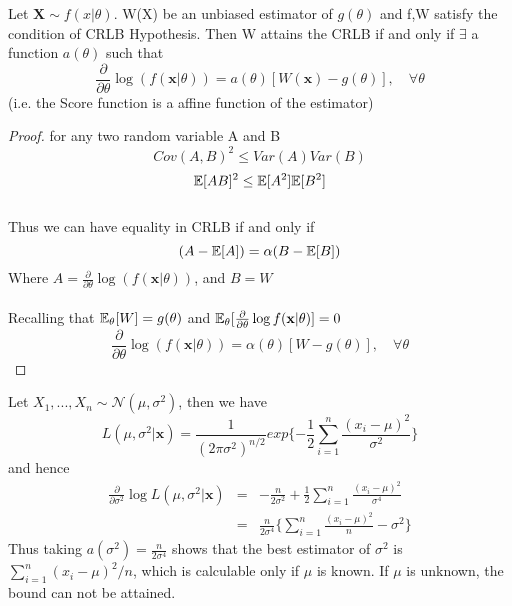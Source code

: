 \documentclass[a4paper,english,12pt]{article}
\newcommand{\bx}{\mathbf{x}}
\newcommand{\bX}{\mathbf{X}}
\begin{document}
\begin{cor}
Let $\bX \sim f(x|\theta)$. W(X) be an unbiased estimator of $g(\theta)$ and f,W satisfy the condition of CRLB Hypothesis. Then W attains the CRLB if and only if $\exists$ a function $a(\theta)$ such that
\begin{equation}
\frac{\partial}{\partial\theta} \log(f(\bx|\theta)) = a(\theta)[W(\bx)-g(\theta)], \quad \forall \theta
\end{equation}
(i.e. the Score function is a affine function of the estimator)
\begin{proof}
for any two random variable A and B
\begin{equation}
Cov(A,B)^2 \leq Var(A)Var(B)
\end{equation}
\begin{equation}
\mathbb{E}[AB]^2 \leq \mathbb{E}[A^2]\mathbb{E}[B^2]
\end{equation} \\
Thus we can have equality in CRLB if and only if
\begin{equation}
(A-\mathbb{E}[A]) = \alpha(B-\mathbb{E}[B])
\end{equation}
Where $A = \frac{\partial}{\partial\theta} \log(f(\bx|\theta))$, and $B=W$ \\ \\
Recalling that $\mathbb{E}_\theta[W] = g(\theta)$ and $\E_\theta[\frac{\partial}{\partial\theta} \log f(\bx|\theta)] = 0$
\begin{equation}
\frac{\partial}{\partial\theta} \log(f(\bx|\theta)) = \alpha(\theta)[W-g(\theta)], \quad \forall \theta
\end{equation}
\end{proof}
\end{cor}

\begin{exmp}[Application]
Let $X_1,...,X_n \sim \mathcal{N}(\mu,\sigma^{2})$, then we have
\begin{equation}
L(\mu,\sigma^2|\bx) = \frac{1}{(2\pi\sigma^2)^{n/2}}exp\{-\frac{1}{2}\sum_{i=1}^{n}\frac{(x_i-\mu)^2}{\sigma^2}\}
\end{equation}
and hence
\begin{eqnarray}
\frac{\partial}{\partial\sigma^2}\log L(\mu,\sigma^2|\bx) &=& -\frac{n}{2\sigma^2} + \frac{1}{2}\sum_{i=1}^{n}\frac{(x_i-\mu)^2}{\sigma^4}\\
&=& \frac{n}{2\sigma^4}\{\sum_{i=1}^{n}\frac{(x_i-\mu)^2}{n} - \sigma^2\}
\end{eqnarray}
Thus taking $a(\sigma^2) = \frac{n}{2\sigma^4}$ shows that the best estimator of $\sigma^2$ is $\sum_{i=1}^{n}{(x_i-\mu)^2}/{n}$, which is calculable only if $\mu$ is known. If $\mu$ is unknown, the bound can not be attained.
\end{exmp}
\end{document}
